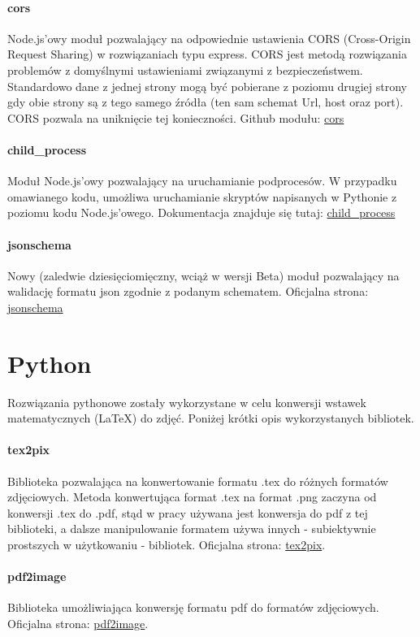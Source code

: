 \paragraph{cors}
Node.js'owy moduł pozwalający na odpowiednie ustawienia CORS (Cross-Origin Request Sharing) w rozwiązaniach typu express. CORS jest metodą rozwiązania problemów z domyślnymi ustawieniami związanymi z bezpieczeństwem. Standardowo dane z jednej strony mogą być pobierane z poziomu drugiej strony gdy obie strony są z tego samego źródła (ten sam schemat Url, host oraz port). CORS pozwala na uniknięcie tej konieczności.
\ind Github modułu: \href{https://github.com/expressjs/cors}{cors}
\paragraph{child\_process}
Moduł Node.js'owy pozwalający na uruchamianie podprocesów. W przypadku omawianego kodu, umożliwa uruchamianie skryptów napisanych  w Pythonie z poziomu kodu Node.js'owego.
\ind Dokumentacja znajduje się tutaj: \href{https://nodejs.org/api/child_process.html}{child\_process}
\paragraph{jsonschema}
\ind Nowy (zaledwie dziesięciomięczny, wciąż w wersji Beta) moduł pozwalający na walidację formatu json zgodnie z podanym schematem.
\ind Oficjalna strona: \href{https://www.npmjs.com/package/jsonschema}{jsonschema}

\section{Python}
Rozwiązania pythonowe zostały wykorzystane w celu konwersji wstawek matematycznych (\LaTeX{}) do zdjęć. Poniżej krótki opis wykorzystanych bibliotek.
\paragraph{tex2pix} Biblioteka pozwalająca na konwertowanie formatu .tex do różnych formatów zdjęciowych. Metoda konwertująca format .tex na format .png zaczyna od konwersji .tex do .pdf, stąd w pracy używana jest konwersja do pdf z tej biblioteki, a dalsze manipulowanie formatem używa innych - subiektywnie prostszych w użytkowaniu - bibliotek. 
\ind Oficjalna strona: \href{https://pypi.org/project/tex2pix/}{tex2pix}.

\paragraph{pdf2image} Biblioteka  umożliwiająca konwersję formatu pdf do formatów zdjęciowych.
\ind Oficjalna strona: \href{https://pypi.org/project/pdf2image/}{pdf2image}.
